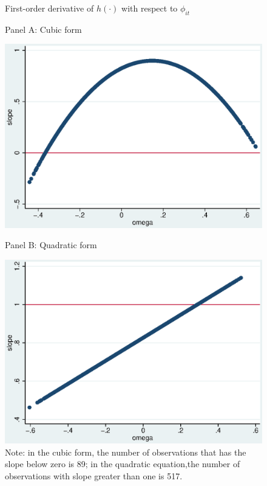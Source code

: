 \documentclass[11pt]{article}
\begin{document}
\begin{figure}[h]
  \centering
  \caption{First-order derivative of $h(\cdot)$ with respect to $\phi_{it}$}
  \label{F2}
  \begin{minipage}[b]{0.45\textwidth}
    \caption*{Panel A: Cubic form}
    \includegraphics[width=\textwidth]{Figs/slope_benchmark.eps}\label{slope1_fig}
  \end{minipage}
  \hfill 
  \begin{minipage}[b]{0.45\textwidth}
    \caption*{Panel B: Quadratic form}
    \includegraphics[width=\textwidth]{Figs/slope_robustness.eps}
  \end{minipage}
 \caption*{Note: in the cubic form, the number of observations that has the slope below zero is 89; in the quadratic equation,the number of observations with slope greater than one is 517. }
\end{figure}
\end{document}
